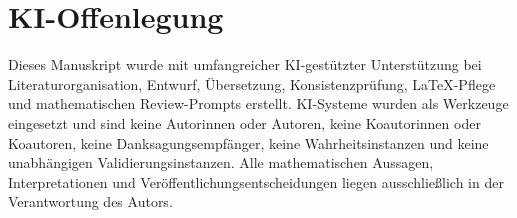\documentclass[11pt]{article}
\theoremstyle{definition}
\theoremstyle{remark}
\begin{document}
\section*{KI-Offenlegung}

Dieses Manuskript wurde mit umfangreicher KI-gestützter Unterstützung
bei Literaturorganisation, Entwurf, Übersetzung, Konsistenzprüfung,
LaTeX-Pflege und mathematischen Review-Prompts erstellt. KI-Systeme
wurden als Werkzeuge eingesetzt und sind keine Autorinnen oder Autoren,
keine Koautorinnen oder Koautoren, keine Danksagungsempfänger, keine
Wahrheitsinstanzen und keine unabhängigen Validierungsinstanzen. Alle
mathematischen Aussagen, Interpretationen und Veröffentlichungsentscheidungen
liegen ausschließlich in der Verantwortung des Autors.
\end{document}
